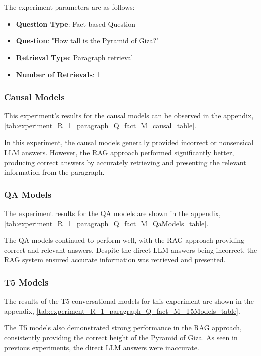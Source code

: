 \documentclass{wseas}
\begin{document}
The experiment parameters are as follows:

\begin{itemize}
  \item
    \textbf{Question Type}: Fact-based Question
  \item
    \textbf{Question}: "How tall is the Pyramid of Giza?"
  \item
    \textbf{Retrieval Type}: Paragraph retrieval
  \item
    \textbf{Number of Retrievals}: 1
\end{itemize}

\subsubsection{Causal Models}

This experiment's results for the causal models can be observed in the appendix,
\autoref{tab:experiment_R_1_paragraph_Q_fact_M_causal_table}.

In this experiment, the causal models generally provided incorrect or nonsensical LLM answers. 
However, the RAG approach performed significantly better, producing correct answers by accurately 
retrieving and presenting the relevant information from the paragraph.

\subsubsection{QA Models}

The experiment results for the QA models are shown in the appendix, \autoref{tab:experiment_R_1_paragraph_Q_fact_M_QaModels_table}.

The QA models continued to perform well, with the RAG approach providing correct and relevant answers.
Despite the direct LLM answers being incorrect, the RAG system ensured accurate information
was retrieved and presented.
\subsubsection{T5 Models}

The results of the T5 conversational models for this experiment
are shown in the appendix, \autoref{tab:experiment_R_1_paragraph_Q_fact_M_T5Models_table}.

The T5 models also demonstrated strong performance in the RAG approach,
consistently providing the correct height of the Pyramid of Giza. As
seen in previous experiments, the direct LLM answers were inaccurate.
\end{document}
